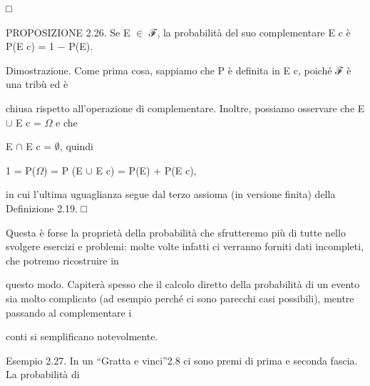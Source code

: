 \documentclass[a4paper,portrait,12pt]{article}
\begin{document}
□


\begin{flushleft}
PROPOSIZIONE 2.26. Se E $\in$ ℱ, la probabilit\`{a} del suo complementare E c \`{e} P(E c) = 1 $-$ P(E).
\end{flushleft}


\begin{flushleft}
Dimostrazione. Come prima cosa, sappiamo che P \`{e} definita in E c, poich\'{e} ℱ \`{e} una tribù ed \`{e}
\end{flushleft}


\begin{flushleft}
chiusa rispetto all'operazione di complementare. Inoltre, possiamo osservare che E $\cup$ E c = $\Omega$ e che
\end{flushleft}


\begin{flushleft}
E $\cap$ E c = $\emptyset$, quindi
\end{flushleft}


\begin{flushleft}
1 = P($\Omega$) = P (E $\cup$ E c) = P(E) + P(E c),
\end{flushleft}


\begin{flushleft}
in cui l'ultima uguaglianza segue dal terzo assioma (in versione finita) della Definizione 2.19. □
\end{flushleft}


\begin{flushleft}
Questa \`{e} forse la propriet\`{a} della probabilit\`{a} che sfrutteremo più di tutte nello svolgere esercizi e problemi: molte volte infatti ci verranno forniti dati incompleti, che potremo ricostruire in
\end{flushleft}


\begin{flushleft}
questo modo. Capiter\`{a} spesso che il calcolo diretto della probabilit\`{a} di un evento sia molto complicato (ad esempio perch\'{e} ci sono parecchi casi possibili), mentre passando al complementare i
\end{flushleft}


\begin{flushleft}
conti si semplificano notevolmente.
\end{flushleft}


\begin{flushleft}
Esempio 2.27. In un ``Gratta e vinci''2.8 ci sono premi di prima e seconda fascia. La probabilit\`{a} di
\end{flushleft}
\end{document}
